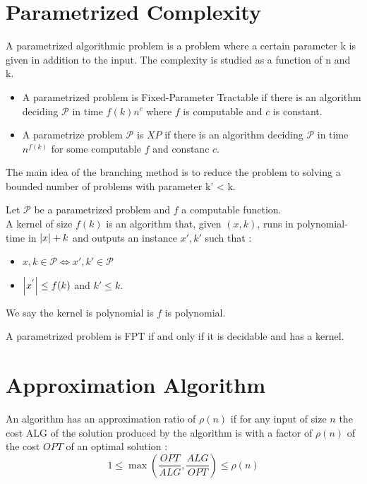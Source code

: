 \documentclass[10pt]{cours}
\begin{document}
\section{Parametrized Complexity}
\begin{definition}
    A parametrized algorithmic problem is a problem where a certain parameter k is given in addition to the input. The complexity is studied as a function of n and k.
\end{definition}
\begin{definition}
    \begin{itemize}
        \item A parametrized problem is Fixed-Parameter Tractable if there is an algorithm deciding $\mathcal{P}$ in time $f(k)n^{c}$ where $f$ is computable and $c$ is constant.
        \item A parametrize problem $\mathcal{P}$ is $XP$ if there is an algorithm deciding $\mathcal{P}$ in time $n^{f(k)}$ for some computable $f$ and constanc $c$.
    \end{itemize}
\end{definition}
\begin{definition}
    The main idea of the branching method is to reduce the problem to solving a bounded number of problems with parameter k' < k.
\end{definition}

\begin{definition}
        Let $\mathcal{P}$ be a parametrized problem and $f$ a computable function.\\
        A kernel of size $f(k)$ is an algorithm that, given $(x, k)$, runs in polynomial-time in $\left|x\right| + k$ and outputs an instance $x', k'$ such that :
        \begin{itemize}
            \item $x, k \in \mathcal{P} \Leftrightarrow x', k' \in \mathcal{P}$
            \item $\left|x^{'}\right| \leq f(k)$ and $k' \leq k$.
        \end{itemize}
        We say the kernel is polynomial is $f$ is polynomial.
\end{definition}


\begin{theorem}
    A parametrized problem is FPT if and only if it is decidable and has a kernel.
\end{theorem}

\section{Approximation Algorithm}
\begin{definition}
    An algorithm has an approximation ratio of $\rho(n)$ if for any input of size $n$ the cost ALG of the solution produced by the algorithm is with a factor of $\rho(n)$ of the cost $OPT$ of an optimal solution : 
    \[
        1 \leq \max \left(\frac{OPT}{ALG}, \frac{ALG}{OPT}\right) \leq \rho(n)
    \]
\end{definition}
\end{document}
